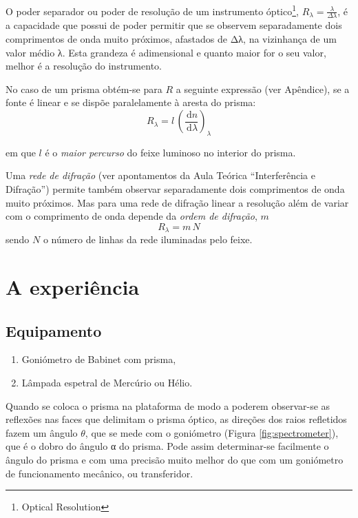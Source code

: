 \documentclass[a4paper,12pt]{article}  %
\newcommand{\ud}{\,\mathrm{d}}
\begin{document}
O poder separador ou poder de resolução de um instrumento óptico\footnote{Optical Resolution}, $R_\lambda = \frac{\lambda}{\Delta \lambda} $,  é a capacidade que possui de poder permitir que se observem separadamente dois comprimentos de onda muito próximos, afastados de Δλ, na vizinhança de um valor médio λ. Esta grandeza é adimensional e quanto maior for o seu valor, melhor é a resolução do instrumento.

No caso de um prisma obtém-se para $R$ a seguinte expressão (ver Apêndice), se a fonte é linear e se dispõe paralelamente à aresta do prisma:
 \begin{equation}
	\label{eq:resolu}
	R_\lambda = l\,\left(\frac{\ud n}{\ud \lambda} \right)_\lambda 
\end{equation}

em que $l$ é o \emph{maior percurso} do feixe luminoso no interior do prisma.

Uma \emph{rede de difração} (ver apontamentos da Aula Teórica  “Interferência e Difração”) permite também observar separadamente dois comprimentos de onda muito próximos.
Mas para uma rede de difração linear a resolução além de variar com o comprimento de onda depende da \emph{ordem de difração}, $m$
 \begin{equation}
	\label{eq:resoludrifa}
	R_\lambda = m\,N 
\end{equation}
sendo $N$  o número de linhas da rede iluminadas pelo feixe.


\section{\sf A experiência}
\subsection{\sf Equipamento}

\begin{enumerate}
\item Goniómetro de Babinet com prisma,
\item Lâmpada espetral de Mercúrio ou Hélio.
\end{enumerate}

Quando se coloca o prisma na plataforma de modo a poderem observar-se as reflexões nas faces que delimitam o prisma óptico, as direções dos raios refletidos fazem um ângulo $\theta$, que se mede com o goniómetro (Figura \ref{fig:spectrometer}), que é o dobro do ângulo α do prisma. Pode assim determinar-se facilmente o ângulo do prisma e com uma precisão muito melhor do que com um goniómetro de funcionamento mecânico, ou transferidor.
\end{document}
